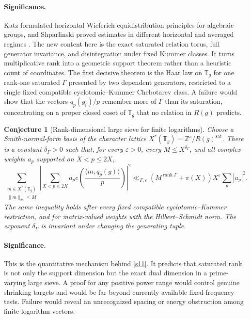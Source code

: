 \documentclass[11pt]{article}
\newtheorem{conjecture}{Conjecture}
\theoremstyle{definition}
\newcommand{\rank}{\operatorname{rank}}
\newcommand{\Z}{\mathbb Z}
\newcommand{\T}{\mathbb T}
\newcommand{\eps}{\varepsilon}
\providecommand{\Z}{\mathbb Z}
\providecommand{\T}{\mathbb T}
\begin{document}
\paragraph{Significance.}
Katz formulated horizontal Wieferich equidistribution principles for algebraic groups,
and Shparlinski proved estimates in different horizontal and averaged regimes
\cite{Katz,Shparlinski}.  The new content here is the exact saturated relation torus,
full generator invariance, and disintegration under fixed Kummer classes.  It turns multiplicative rank into a geometric support theorem rather than a heuristic count of coordinates. The first decisive theorem is the Haar law on $\mathbb T_g$ for one rank-one saturated $\Gamma$ presented by two dependent generators, restricted to a single fixed compatible cyclotomic--Kummer Chebotarev class. A failure would show that the vectors $q_p(g_i)/p$ remember more of $\Gamma$ than its saturation, concentrating on a proper closed coset of $\mathbb T_g$ that no relation in $R(g)$ predicts.

\begin{conjecture}[Rank-dimensional large sieve for finite logarithms]\label{s12}
Choose a Smith-normal-form basis of the character lattice
$X^*(\T_g)=\Z^s/R(g)^{\mathrm{sat}}$.  There is a constant $\delta_\Gamma>0$ such that,
for every $\eps>0$, every $M\le X^{\delta_\Gamma}$, and all complex weights $a_p$
supported on $X<p\le2X$,
\[
 \sum_{\substack{m\in X^*(\T_g)\\\|m\|_\infty\le M}}
 \left|\sum_{X<p\le2X}a_p
 e\!\left(\frac{\langle m,q_p(g)\rangle}{p}\right)\right|^2
 \ll_{\Gamma,\eps}(M^{\rank\Gamma}+\pi(X))X^\eps\sum_p|a_p|^2.
\]
The same inequality holds after every fixed compatible cyclotomic--Kummer restriction,
and for matrix-valued weights with the Hilbert--Schmidt norm.  The exponent
$\delta_\Gamma$ is invariant under changing the generating tuple.
\end{conjecture}

\paragraph{Significance.}
This is the quantitative mechanism behind \cref{s11}.  It predicts that saturated rank is
not only the support dimension but the exact dual dimension in a prime-varying large
sieve.  A proof for any positive power range would control genuine shrinking targets
and would be far beyond currently available fixed-frequency tests.  Failure would reveal
an unrecognized spacing or energy obstruction among finite-logarithm vectors.
\end{document}
